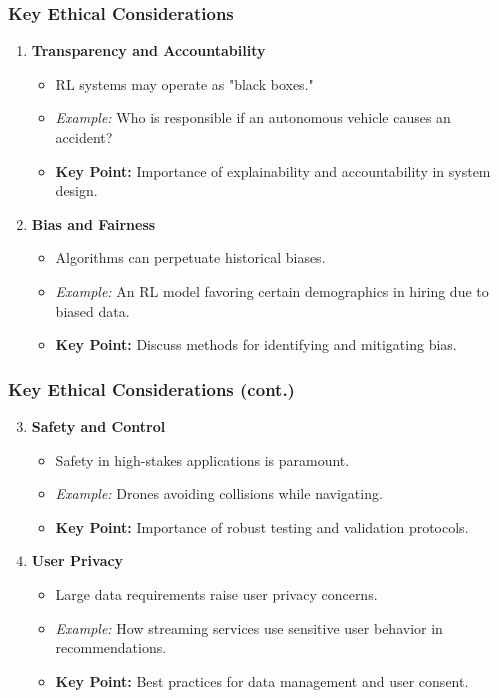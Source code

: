 \documentclass[aspectratio=169]{beamer}
\begin{document}
\begin{frame}[fragile]
  \frametitle{Key Ethical Considerations}
  \begin{enumerate}
    \item \textbf{Transparency and Accountability}
      \begin{itemize}
        \item RL systems may operate as "black boxes."
        \item \textit{Example:} Who is responsible if an autonomous vehicle causes an accident?
        \item \textbf{Key Point:} Importance of explainability and accountability in system design.
      \end{itemize}

    \item \textbf{Bias and Fairness}
      \begin{itemize}
        \item Algorithms can perpetuate historical biases.
        \item \textit{Example:} An RL model favoring certain demographics in hiring due to biased data.
        \item \textbf{Key Point:} Discuss methods for identifying and mitigating bias.
      \end{itemize}
  \end{enumerate}
\end{frame}

\begin{frame}[fragile]
  \frametitle{Key Ethical Considerations (cont.)}
  \begin{enumerate}
    \setcounter{enumi}{2}
    \item \textbf{Safety and Control}
      \begin{itemize}
        \item Safety in high-stakes applications is paramount.
        \item \textit{Example:} Drones avoiding collisions while navigating.
        \item \textbf{Key Point:} Importance of robust testing and validation protocols.
      \end{itemize}

    \item \textbf{User Privacy}
      \begin{itemize}
        \item Large data requirements raise user privacy concerns.
        \item \textit{Example:} How streaming services use sensitive user behavior in recommendations.
        \item \textbf{Key Point:} Best practices for data management and user consent.
      \end{itemize}
  \end{enumerate}
\end{frame}
\end{document}
